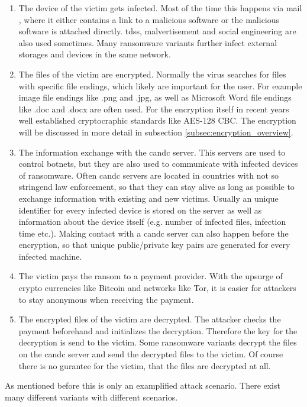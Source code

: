 \begin{enumerate}
\item The device of the victim gets infected. Most of the time this happens via mail \cite{OstermanResearch2016}, where it either contains a link to a malicious software or the malicious software is attached directly. \glspl{tds}, malvertisement and social engineering are also used sometimes. Many ransomware variants further infect external storages and devices in the same network.
\item The files of the victim are encrypted. Normally the virus searches for files with specific file endings, which likely are important for the user. For example image file endings like .png and .jpg, as well as Microsoft Word file endings like .doc and .docx are often used. For the encryption itself in recent years well established cryptocraphic standards like AES-128 CBC. The encryption will be discussed in more detail in subsection \ref{subsec:encryption_overview}.
\item The information exchange with the \gls{candc} server. This servers are used to control botnets, but they are also used to communicate with infected devices of ransomware. Often \gls{candc} servers are located in countries with not so stringend law enforcement, so that they can stay alive as long as possible to exchange information with existing and new victims. Usually an unique identifier for every infected device is stored on the server as well as information about the device itself (e.g. number of infected files, infection time etc.). Making contact with a \gls{candc} server can also happen before the encryption, so that unique public/private key pairs are generated for every infected machine.
\item The victim pays the ransom to a payment provider. With the upsurge of crypto currencies like Bitcoin and networks like Tor, it is easier for attackers to stay anonymous when receiving the payment\cite{Liao2016}.
\item The encrypted files of the victim are decrypted. The attacker checks the payment beforehand and initializes the decryption. Therefore the key for the decryption is send to the victim. Some ransomware variants decrypt the files on the \gls{candc} server and send the decrypted files to the victim. Of course there is no gurantee for the victim, that the files are decrypted at all.
\end{enumerate}

As mentioned before this is only an examplified attack scenario. There exist many different variants with different scenarios.

